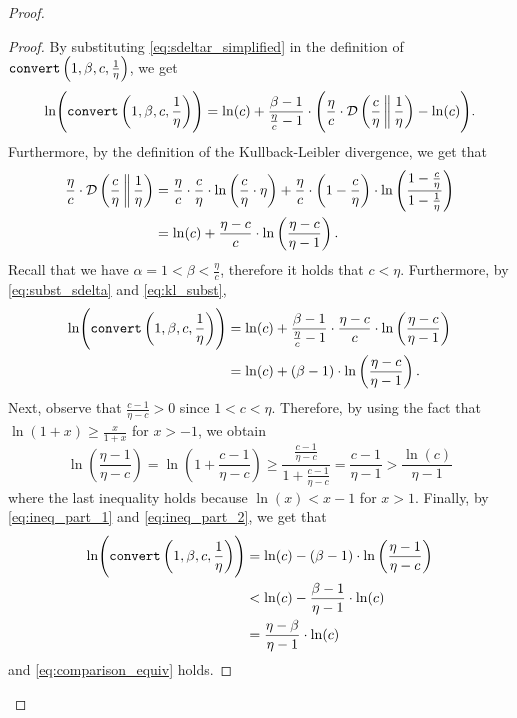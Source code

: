 \documentclass[letterpaper,11pt]{article}
\newenvironment{claimproof}{\begin{proof}\renewcommand{\qedsymbol}{$\lrcorner$}}{\end{proof}}
\newcommand{\1}[1]{\mathds{1}\left[#1\right]}
\newcommand{\runtime}[1][\alpha, \beta, c, q]{\textnormal{\texttt{convert}}\left(#1\right)}
\newcommand{\D}[2]{\mathcal{D}\left(#1\, \middle\|\,#2 \right)}
\begin{document}
\begin{proof}
	\begin{claimproof}
		By substituting \eqref{eq:sdeltar_simplified} in the definition of $\runtime[1,\beta,c,\frac{1}{\eta}]$,
		we get
		\begin{equation}\label{eq:subst_sdelta}
			\ln\Biggl(\runtime[1,\beta,c,\frac{1}{\eta}]\Biggr) = \ln(c) + \frac{\beta - 1}{\frac{\eta}{c} - 1} \cdot \Biggl(\frac{\eta}{c} \cdot \D{\frac{c}{\eta}}{\frac{1}{\eta}} - \ln(c)\Biggr).
		\end{equation}
		Furthermore, by  the definition of the Kullback-Leibler divergence, we get that
		\begin{align}
			\frac{\eta}{c} \cdot \D{\frac{c}{\eta}}{\frac{1}{\eta}} &= \frac{\eta}{c} \cdot \frac{c}{\eta} \cdot \ln\left( \frac{c}{\eta} \cdot \eta \right)  + \frac{\eta}{c} \cdot \left( 1 - \frac{c}{\eta} \right) \cdot \ln\left( \frac{1 - \frac{c}{\eta}}{1 - \frac{1}{\eta}} \right) \notag\\
										&= \ln(c) + \frac{\eta - c}{c} \cdot \ln\left( \frac{\eta - c}{\eta - 1} \right)\label{eq:kl_subst}.
		\end{align}
		Recall that we have $\alpha  = 1 < \beta < \frac{\eta}{c}$, therefore it holds that $c < \eta$.
		Furthermore, by \eqref{eq:subst_sdelta} and \eqref{eq:kl_subst},
		\begin{align}
			\ln\Biggl(\runtime[1,\beta,c,\frac{1}{\eta}]\Biggr) &= \ln(c) + \frac{\beta - 1}{\frac{\eta}{c} - 1} \cdot \frac{\eta - c}{c} \cdot \ln\left( \frac{\eta - c}{\eta - 1} \right) \notag\\
										    &= \ln(c) + (\beta - 1) \cdot \ln\left( \frac{\eta - c}{\eta - 1} \right).\label{eq:ineq_part_1}
		\end{align}
		Next, observe that $\frac{c - 1}{\eta -c} > 0$ since $1 < c < \eta$.
		Therefore, by using the fact that $\ln(1 + x) \geq \frac{x}{1 + x}$ for $x > -1$,
		we obtain
		\begin{equation}\label{eq:ineq_part_2}
			\ln\left( \frac{\eta- 1}{\eta - c} \right) = \ln\left( 1 + \frac{c - 1}{\eta - c} \right) \geq \frac{\frac{c -1}{\eta - c} }{1 + \frac{c-1}{\eta -c }}= \frac{c-1}{\eta- 1} > \frac{\ln(c)}{\eta - 1}
		\end{equation}
		where the last inequality holds because $\ln(x) < x - 1$ for $x > 1$.
		Finally, by \eqref{eq:ineq_part_1} and \eqref{eq:ineq_part_2}, we get that
		\begin{align*}
			\ln\Biggl(\runtime[1,\beta,c,\frac{1}{\eta}]\Biggr) &= \ln(c) - (\beta - 1) \cdot \ln\left( \frac{\eta - 1}{\eta - c} \right) \\
										    &< \ln(c) - \frac{\beta - 1}{\eta - 1} \cdot \ln(c)\\
										    &=  \frac{\eta - \beta}{\eta - 1}  \cdot \ln(c)
		\end{align*}
		and \eqref{eq:comparison_equiv} holds.
	\end{claimproof}


\end{proof}
\end{document}
